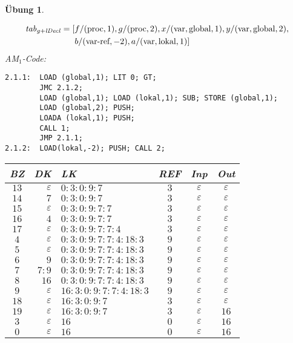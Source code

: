 \documentclass[11pt, twoside, BCOR=16mm, a4paper, DIV=15, numbers=noenddot]{scrartcl}
\theoremstyle{break}
\newtheorem{ex}{Übung}
\begin{document}
\begin{ex}
  \begin{teilaufg}
\item
\setlength\abovedisplayskip{-\baselineskip}
\begin{align*}
	\mathit{tab}_{g + \mathit{lDecl}} = [
&
	f / (\textnormal{proc}, 1),
	g / (\textnormal{proc}, 2),
	x / (\textnormal{var}, \textnormal{global}, 1),
	y / (\textnormal{var}, \textnormal{global}, 2),
\\&
	b / (\textnormal{var-ref}, -2),
	a / (\textnormal{var}, \textnormal{lokal}, 1) ]
\end{align*}
AM$_1$-Code:
\begin{lstlisting}[numbers=none]
2.1.1:  LOAD (global,1); LIT 0; GT;
        JMC 2.1.2;
        LOAD (global,1); LOAD (lokal,1); SUB; STORE (global,1);
        LOAD (global,2); PUSH;
        LOADA (lokal,1); PUSH;
        CALL 1;
        JMP 2.1.1;
2.1.2:  LOAD(lokal,-2); PUSH; CALL 2; 
\end{lstlisting}

\item
\begin{tabular}[t]{c|r|l|c|c|c}
BZ& DK&LK&REF&Inp&Out \\ \hline \hline
$13$&$\varepsilon$&$0:3:0:9:7$&$3$&$\varepsilon$&$\varepsilon$\\ \hline
$14$&$7$&$0:3:0:9:7$&$3$&$\varepsilon$&$\varepsilon$\\ \hline
$15$&$\varepsilon$&$0:3:0:9:7:7$&$3$&$\varepsilon$&$\varepsilon$\\ \hline
$16$&$4$&$0:3:0:9:7:7$&$3$&$\varepsilon$&$\varepsilon$\\ \hline
$17$&$\varepsilon$&$0:3:0:9:7:7:4$&$3$&$\varepsilon$&$\varepsilon$\\ \hline
$4$&$\varepsilon$&$0:3:0:9:7:7:4:18:3$&$9$&$\varepsilon$&$\varepsilon$\\ \hline
$5$&$\varepsilon$&$0:3:0:9:7:7:4:18:3$&$9$&$\varepsilon$&$\varepsilon$\\ \hline
$6$&$9$&$0:3:0:9:7:7:4:18:3$&$9$&$\varepsilon$&$\varepsilon$\\ \hline
$7$&$7:9$&$0:3:0:9:7:7:4:18:3$&$9$&$\varepsilon$&$\varepsilon$\\ \hline
$8$&$16$&$0:3:0:9:7:7:4:18:3$&$9$&$\varepsilon$&$\varepsilon$\\ \hline
$9$&$\varepsilon$&$16:3:0:9:7:7:4:18:3$&$9$&$\varepsilon$&$\varepsilon$\\ \hline
$18$&$\varepsilon$&$16:3:0:9:7$&$3$&$\varepsilon$&$\varepsilon$\\ \hline
$19$&$\varepsilon$&$16:3:0:9:7$&$3$&$\varepsilon$&$16$\\ \hline
$3$&$\varepsilon$&$16$&$0$&$\varepsilon$&$16$\\ \hline
$0$&$\varepsilon$&$16$&$0$&$\varepsilon$&$16$\\ \hline
\end{tabular}
\end{teilaufg}
\end{ex}
\end{document}
